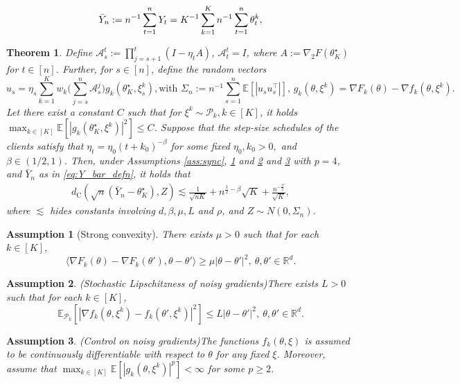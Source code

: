 \documentclass[10pt,a4paper]{amsart}
\newtheorem{assumption}{Assumption}
\newtheorem{theorem}{Theorem}
\def\IE{\mathbb{E}}
\def\R{\mathbb{R}}
\newcommand{\minparam}{\theta^\star_K}
\begin{document}
\begin{align} \label{eq:Y_bar_defn}
    \Bar{Y}_n:= n^{-1}\sum_{t=1}^n Y_t = K^{-1} \sum_{k=1}^K n^{-1}\sum_{t=1}^n \theta_t^k,
\end{align}

\begin{theorem}\label{thm: berry-esseen}
   Define $\mathcal{A}_s^t:=\prod_{j=s+1}^t(I-\eta_tA)$, $\mathcal{A}_t^t=I$, where $A:=\nabla_2 F(\minparam)$ for $t \in [n]$. Further, for $s\in [n]$, define the random vectors 
   \[ u_s = \eta_s\sum_{k=1}^K w_k\bigg(\sum_{j=s}^n \mathcal{A}_s^j\bigg) g_k(\minparam, \xi_s^k), \text{with $\Sigma_n:= n^{-1}\sum_{s=1}^n\IE[|u_s u_s^\top|]$, $g_k(\theta, \xi^{k}) = \nabla F_k(\theta) - \nabla f_k(\theta, \xi^k)$.} \]
Let there exist a constant $C$ such that for $\xi^k\sim \mathcal{P}_k, k\in [K]$, it holds  $\max_{k \in [K]} \IE[|g_k(\minparam, \xi^k)|^2]\leq C$. Suppose that the step-size schedules of the clients satisfy that $ \eta_{t} = \eta_0(t+ k_0)^{-\beta}$ for some fixed $\eta_0, k_0>0,$ and $\beta \in (1/2, 1)$. Then, under Assumptions \ref{ass:sync}, \ref{ass:sc} and \ref{ass:Lipschitz} and \ref{ass:boundedloss} with $p=4$, and $\bar{Y}_n$ as in \eqref{eq:Y_bar_defn}, it holds that
    \begin{align}\label{eq:berry-esseen}
        d_{\mathrm{C}}( \sqrt{n}(\bar{Y}_n - \minparam) , Z)  \lesssim \frac{1}{\sqrt{nK}}  + n^{\frac{1}{2}-\beta} \sqrt{K} + \frac{n^{-\frac{\beta}{2}}}{\sqrt{K}} ,
    \end{align}
    where $\lesssim$ hides constants involving $d, \beta, \mu, L$ and $\rho$, and $Z \sim N(0, \Sigma_n)$. 
\end{theorem}

\begin{assumption}[Strong convexity]\label{ass:sc}
    There exists $\mu>0$ such that for each $k\in [K]$, 
    \[ \langle\nabla F_k(\theta) - \nabla F_k(\theta'), \theta-\theta'\rangle \geq \mu |\theta-\theta'|^2, \ \theta, \theta' \in \R^d. \]
\end{assumption}

\begin{assumption}(Stochastic Lipschitzness of noisy gradients)\label{ass:Lipschitz}
    There exists $L>0$ such that for each $k \in [K]$,
    \[ \IE_{\mathcal{P}_k}[|\nabla f_k(\theta, \xi^k)- f_k(\theta', \xi^k)|^2] \leq L|\theta - \theta'|^2, \ \theta, \theta' \in \R^d.\]
\end{assumption}

\begin{assumption}(Control on noisy gradients)\label{ass:boundedloss}
The functions $f_k(\theta, \xi)$ is assumed to be continuously differentiable with respect to $\theta$ for any fixed $\xi$. Moreover, assume that $\max_{k\in [K]}\IE[|g_k(\theta, \xi^k)|^p]< \infty$ for some $p \geq 2$.
\end{assumption}
\end{document}
